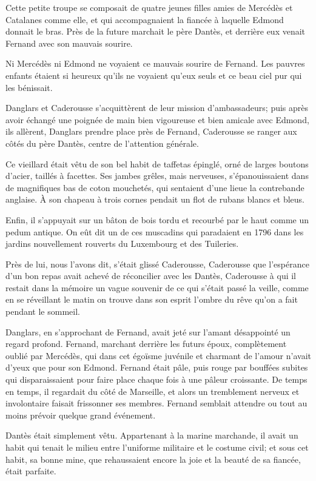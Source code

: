 Cette petite troupe se composait de quatre jeunes filles amies de Mercédès et Catalanes comme elle, et qui accompagnaient la fiancée à laquelle Edmond donnait le bras. Près de la future marchait le père Dantès, et derrière eux venait Fernand avec son mauvais sourire.

Ni Mercédès ni Edmond ne voyaient ce mauvais sourire de Fernand. Les pauvres enfants étaient si heureux qu'ils ne voyaient qu'eux seuls et ce beau ciel pur qui les bénissait.

Danglars et Caderousse s'acquittèrent de leur mission d'ambassadeurs; puis après avoir échangé une poignée de main bien vigoureuse et bien amicale avec Edmond, ils allèrent, Danglars prendre place près de Fernand, Caderousse se ranger aux côtés du père Dantès, centre de l'attention générale.

Ce vieillard était vêtu de son bel habit de taffetas épinglé, orné de larges boutons d'acier, taillés à facettes. Ses jambes grêles, mais nerveuses, s'épanouissaient dans de magnifiques bas de coton mouchetés, qui sentaient d'une lieue la contrebande anglaise. À son chapeau à trois cornes pendait un flot de rubans blancs et bleus.

Enfin, il s'appuyait sur un bâton de bois tordu et recourbé par le haut comme un pedum antique. On eût dit un de ces muscadins qui paradaient en 1796 dans les jardins nouvellement rouverts du Luxembourg et des Tuileries.

Près de lui, nous l'avons dit, s'était glissé Caderousse, Caderousse que l'espérance d'un bon repas avait achevé de réconcilier avec les Dantès, Caderousse à qui il restait dans la mémoire un vague souvenir de ce qui s'était passé la veille, comme en se réveillant le matin on trouve dans son esprit l'ombre du rêve qu'on a fait pendant le sommeil.

Danglars, en s'approchant de Fernand, avait jeté sur l'amant désappointé un regard profond. Fernand, marchant derrière les futurs époux, complètement oublié par Mercédès, qui dans cet égoïsme juvénile et charmant de l'amour n'avait d'yeux que pour son Edmond. Fernand était pâle, puis rouge par bouffées subites qui disparaissaient pour faire place chaque fois à une pâleur croissante. De temps en temps, il regardait du côté de Marseille, et alors un tremblement nerveux et involontaire faisait frissonner ses membres. Fernand semblait attendre ou tout au moins prévoir quelque grand événement.

Dantès était simplement vêtu. Appartenant à la marine marchande, il avait un habit qui tenait le milieu entre l'uniforme militaire et le costume civil; et sous cet habit, sa bonne mine, que rehaussaient encore la joie et la beauté de sa fiancée, était parfaite.

